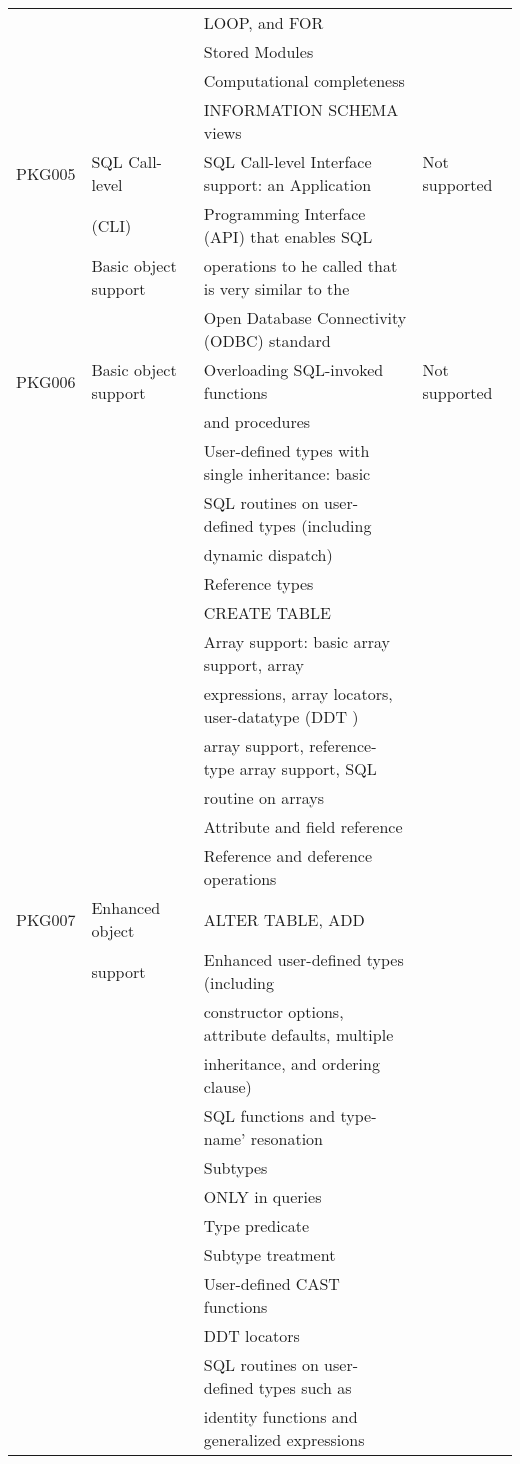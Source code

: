 \documentclass[10pt,twocolumn,fleqn]{article}
\begin{document}
\begin{tabular}{l | l | l| l |}
	&	 	&LOOP, and FOR	& \\
	&	 	&Stored Modules	& \\
	&	 	&Computational completeness	& \\
	&	 	&INFORMATION SCHEMA views	& \\
PKG005	&SQL Call-level	&SQL Call-level Interface support: an Application	& Not supported\\
&(CLI)	&Programming Interface (API) that enables SQL	& \\
	&Basic object support	&operations to he called that is very similar to the	& \\
	&	 & Open Database Connectivity (ODBC) standard	& \\
PKG006	&Basic object support&Overloading SQL-invoked functions & Not supported\\
	&		& and procedures	& \\
	&	 	&User-defined types with single inheritance: basic	& \\
	&	&SQL routines on user-defined types (including	& \\
	&	&dynamic dispatch)	& \\
	&	 	&Reference types	& \\
	&	 	&CREATE TABLE	& \\
	&	 	&Array support: basic array support, array	& \\
	&	&expressions, array locators, user-datatype (DDT )	& \\
	&	&array support, reference-type array support, SQL	& \\
	&	&routine on arrays	& \\
	&	 	&Attribute and field reference	& \\
	&	 	&Reference and deference operations	& \\
PKG007	& Enhanced object&ALTER TABLE, ADD	& \\
	& support	&Enhanced user-defined types (including	& \\
	&	&constructor options, attribute defaults, multiple	& \\
	&	&inheritance, and ordering clause)	& \\
	&	 	&SQL functions and type-name' resonation	& \\
	&	 	&Subtypes	& \\
	&	 	&ONLY in queries	& \\
	&	 	&Type predicate	& \\
	&	 	&Subtype treatment	& \\
	&	 	&User-defined CAST functions	& \\
	&	 	&DDT locators	& \\
	&	 	&SQL routines on user-defined types such as	& \\
	&	&identity functions and generalized expressions	& \\
\end{tabular}	
\end{document}
